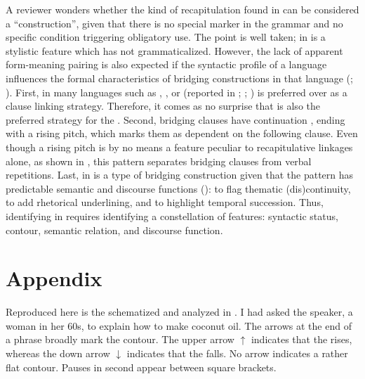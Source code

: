 \documentclass[output=paper]{LSP/langsci}
\begin{document}
A reviewer wonders whether the kind of recapitulation found in  can be considered a ``construction'', given that there is no special marker in the grammar and no specific condition triggering obligatory use. The point is well taken;  in  is a stylistic feature which has not grammaticalized. However, the lack of apparent form-meaning pairing is also expected if the syntactic profile of a language influences the formal characteristics of bridging constructions in that language (\citealt{devries.2005}; \citealt[][898]{seifart10}). First, in many  languages such as , ,  or  (reported in \citealt{bril10}; \citealt{Lichtenberk83}; \citealt[][53]{lynch02})  is preferred over  as a clause linking strategy.  Therefore, it comes as no surprise that  is also the preferred strategy for the . Second, bridging clauses have continuation , ending with a rising pitch, which marks them as dependent on the following clause. Even though a rising pitch is by no means a feature peculiar to recapitulative linkages alone, as shown in , this  pattern separates bridging clauses from verbal repetitions. Last,  in  is a type of bridging construction given that the pattern has predictable semantic and discourse functions (): to flag thematic (dis)continuity, to add rhetorical underlining, and to highlight temporal succession. Thus, identifying  in  requires identifying a constellation of features: syntactic status,  contour, semantic relation, and discourse function.

 \section*{Appendix}
 \setcounter{equation}{0}
 
Reproduced here is the  schematized and analyzed in . I had asked the speaker, a woman in her 60s, to explain how to make coconut oil. The arrows at the end of a phrase broadly mark the  contour. The upper arrow $\uparrow$ indicates that the  rises, whereas the down arrow $\downarrow$  indicates that the  falls. No arrow indicates a rather flat  contour. Pauses in second appear between square brackets.
 
\end{document}
